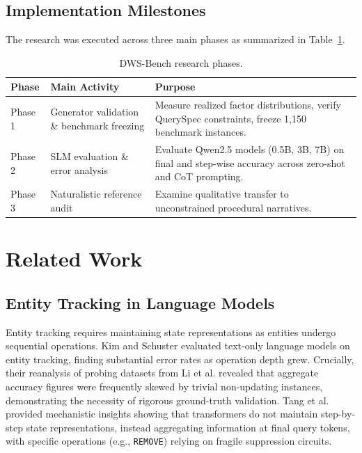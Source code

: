 \documentclass{iutbscthesis}
\begin{document}
\section{Implementation Milestones}
The research was executed across three main phases as summarized in Table~\ref{tab:milestones}.

\begin{table}[H]
\centering
\small
\begin{tabular}{p{}p{}p{}}
\toprule
\textbf{Phase} & \textbf{Main Activity} & \textbf{Purpose} \\
\midrule
Phase 1 & Generator validation \& benchmark freezing & Measure realized factor distributions, verify QuerySpec constraints, freeze 1,150 benchmark instances. \\
Phase 2 & SLM evaluation \& error analysis & Evaluate Qwen2.5 models (0.5B, 3B, 7B) on final and step-wise accuracy across zero-shot and CoT prompting. \\
Phase 3 & Naturalistic reference audit & Examine qualitative transfer to unconstrained procedural narratives. \\
\bottomrule
\end{tabular}
\caption{DWS-Bench research phases.}
\label{tab:milestones}
\end{table}

\chapter{Related Work}

\section{Entity Tracking in Language Models}
Entity tracking requires maintaining state representations as entities undergo sequential operations. Kim and Schuster \cite{kim2023entity} evaluated text-only language models on entity tracking, finding substantial error rates as operation depth grew. Crucially, their reanalysis of probing datasets from Li et al. \cite{li2021implicit} revealed that aggregate accuracy figures were frequently skewed by trivial non-updating instances, demonstrating the necessity of rigorous ground-truth validation. Tang et al. \cite{tang2026track} provided mechanistic insights showing that transformers do not maintain step-by-step state representations, instead aggregating information at final query tokens, with specific operations (e.g., \texttt{REMOVE}) relying on fragile suppression circuits.
\end{document}
